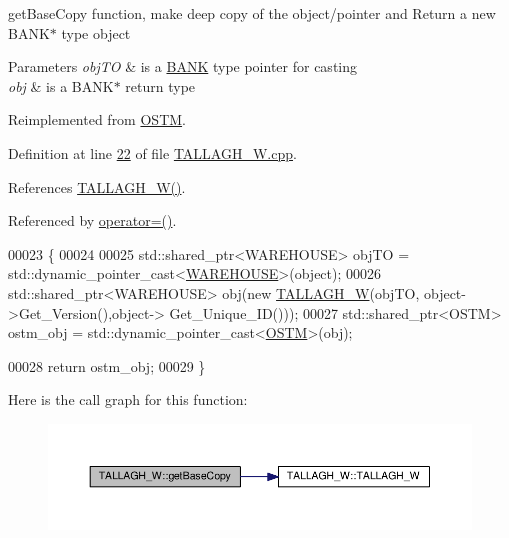 get\+Base\+Copy function, make deep copy of the object/pointer and Return a new B\+A\+N\+K$\ast$ type object 


\begin{DoxyParams}{Parameters}
{\em obj\+TO} & is a \hyperlink{class_b_a_n_k}{B\+A\+NK} type pointer for casting \\
\hline
{\em obj} & is a B\+A\+N\+K$\ast$ return type \\
\hline
\end{DoxyParams}


Reimplemented from \hyperlink{class_o_s_t_m_a0bfa3763bd441407dd6365f42714f94c_a0bfa3763bd441407dd6365f42714f94c}{O\+S\+TM}.



Definition at line \hyperlink{_t_a_l_l_a_g_h___w_8cpp_source_l00022}{22} of file \hyperlink{_t_a_l_l_a_g_h___w_8cpp_source}{T\+A\+L\+L\+A\+G\+H\+\_\+\+W.\+cpp}.



References \hyperlink{_t_a_l_l_a_g_h___w_8h_source_l00024}{T\+A\+L\+L\+A\+G\+H\+\_\+\+W()}.



Referenced by \hyperlink{_t_a_l_l_a_g_h___w_8h_source_l00075}{operator=()}.


\begin{DoxyCode}
00023 \{
00024 
00025     std::shared\_ptr<WAREHOUSE> objTO = std::dynamic\_pointer\_cast<\hyperlink{class_w_a_r_e_h_o_u_s_e}{WAREHOUSE}>(object);
00026     std::shared\_ptr<WAREHOUSE> obj(\textcolor{keyword}{new} \hyperlink{class_t_a_l_l_a_g_h___w_aeafc411edee7a3e8bfcc54fa478e2104_aeafc411edee7a3e8bfcc54fa478e2104}{TALLAGH\_W}(objTO, object->Get\_Version(),\textcolor{keywordtype}{object}->
      Get\_Unique\_ID()));
00027     std::shared\_ptr<OSTM> ostm\_obj = std::dynamic\_pointer\_cast<\hyperlink{class_o_s_t_m}{OSTM}>(obj);                             
           
00028     \textcolor{keywordflow}{return} ostm\_obj;
00029 \}
\end{DoxyCode}


Here is the call graph for this function\+:\nopagebreak
\begin{figure}[H]
\begin{center}
\leavevmode
\includegraphics[width=350pt]{class_t_a_l_l_a_g_h___w_a51957c778c31d56f98febdf294f88a4c_a51957c778c31d56f98febdf294f88a4c_cgraph}
\end{center}
\end{figure}


